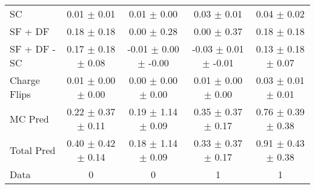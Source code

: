 \begin{tabular}{l|cccc}
                                 SC &  0.01 $\pm$  0.01 &  0.01 $\pm$  0.00 &  0.03 $\pm$  0.01 &  0.04 $\pm$  0.02 \\
                            SF + DF &  0.18 $\pm$  0.18 &  0.00 $\pm$  0.28 &  0.00 $\pm$  0.37 &  0.18 $\pm$  0.18 \\
\hline
                       SF + DF - SC &  0.17 $\pm$  0.18 $\pm$  0.08 & -0.01 $\pm$  0.00 $\pm$ -0.00 & -0.03 $\pm$  0.01 $\pm$ -0.01 &  0.13 $\pm$  0.18 $\pm$  0.07 \\
\hline\hline
                       Charge Flips &  0.01 $\pm$  0.00 $\pm$  0.00 &  0.00 $\pm$  0.00 $\pm$  0.00 &  0.01 $\pm$  0.00 $\pm$  0.00 &  0.03 $\pm$  0.01 $\pm$  0.01 \\
\hline
                            MC Pred &  0.22 $\pm$  0.37 $\pm$  0.11 &  0.19 $\pm$  1.14 $\pm$  0.09 &  0.35 $\pm$  0.37 $\pm$  0.17 &  0.76 $\pm$  0.39 $\pm$  0.38 \\
\hline
                         Total Pred &  0.40 $\pm$  0.42 $\pm$  0.14 &  0.18 $\pm$  1.14 $\pm$  0.09 &  0.33 $\pm$  0.37 $\pm$  0.17 &  0.91 $\pm$  0.43 $\pm$  0.38 \\
\hline\hline
                               Data &     0 &     0 &     1 &     1 \\
\hline\hline
\end{tabular}

